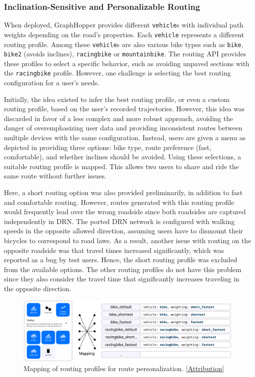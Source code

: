 \subsubsection{Inclination-Sensitive and Personalizable Routing}\label{sec:maxlorenz3}

When deployed, GraphHopper provides different \texttt{vehicle}s with individual path weights depending on the road's properties. Each \texttt{vehicle} represents a different routing profile. Among these \texttt{vehicle}s are also various bike types such as \texttt{bike}, \texttt{bike2} (avoids inclines), \texttt{racingbike} or \texttt{mountainbike}. The routing API provides these profiles to select a specific behavior, such as avoiding unpaved sections with the \texttt{racingbike} profile. However, one challenge is selecting the best routing configuration for a user's needs. 

Initially, the idea existed to infer the best routing profile, or even a custom routing profile, based on the user's recorded trajectories. However, this idea was discarded in favor of a less complex and more robust approach, avoiding the danger of overemphasizing user data and providing inconsistent routes between multiple devices with the same configuration. Instead, users are given a menu as depicted in  providing three options: bike type, route preference (fast, comfortable), and whether inclines should be avoided. Using these selections, a suitable routing profile is mapped. This allows two users to share and ride the same route without further issues.

Here, a short routing option was also provided preliminarily, in addition to fast and comfortable routing. However, routes generated with this routing profile would frequently lead over the wrong roadside since both roadsides are captured independently in DRN. The ported DRN network is configured with walking speeds in the opposite allowed direction, assuming users have to dismount their bicycles to correspond to road laws. As a result, another issue with routing on the opposite roadside was that travel times increased significantly, which was reported as a bug by test users. Hence, the short routing profile was excluded from the available options. The other routing profiles do not have this problem since they also consider the travel time that significantly increases traveling in the opposite direction.

\begin{figure}[t]
\centering
\includegraphics[width=\linewidth]{images/routing-profile-mapping.pdf}
\caption{Mapping of routing profiles for route personalization. [\hyperref[attribution]{Attribution}]}
\label{fig:routing-profile-mapping}
\end{figure}

